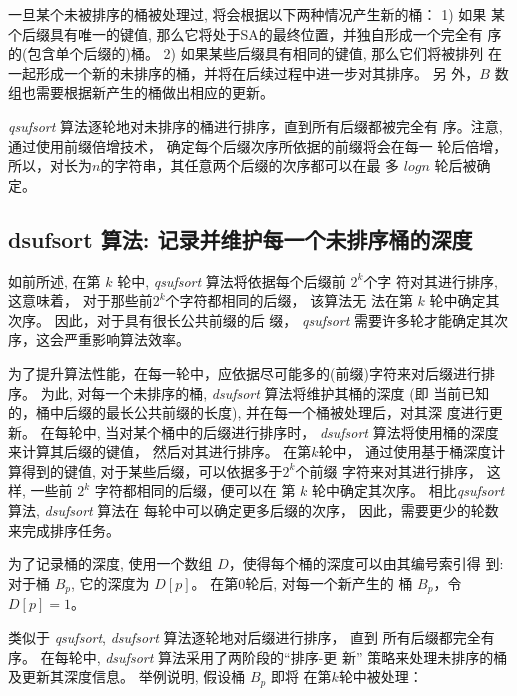 一旦某个未被排序的桶被处理过, 将会根据以下两种情况产生新的桶： 1) 如果
某个后缀具有唯一的键值, 那么它将处于SA的最终位置，并独自形成一个完全有
序的(包含单个后缀的)桶。 2) 如果某些后缀具有相同的键值, 那么它们将被排列
在一起形成一个新的未排序的桶，并将在后续过程中进一步对其排序。 另
外，$B$ 数组也需要根据新产生的桶做出相应的更新。

\emph{qsufsort} 算法逐轮地对未排序的桶进行排序，直到所有后缀都被完全有
序。注意, 通过使用前缀倍增技术， 确定每个后缀次序所依据的前缀将会在每一
轮后倍增，所以，对长为$n$的字符串，其任意两个后缀的次序都可以在最
多 $logn$ 轮后被确定。

\subsection{dsufsort 算法: 记录并维护每一个未排序桶的深度}
\label{sec:dsufsort}

如前所述, 在第 $k$ 轮中, \emph{qsufsort} 算法将依据每个后缀前 $2^k$个字
符对其进行排序, 这意味着， 对于那些前$2^k$个字符都相同的后缀， 该算法无
法在第 $k$ 轮中确定其次序。 因此，对于具有很长公共前缀的后
缀， \emph{qsufsort} 需要许多轮才能确定其次序，这会严重影响算法效率。

为了提升算法性能，在每一轮中，应依据尽可能多的(前缀)字符来对后缀进行排
序。 为此, 对每一个未排序的桶, \emph{dsufsort} 算法将维护其桶的深度 (即
当前已知的，桶中后缀的最长公共前缀的长度), 并在每一个桶被处理后，对其深
度进行更新。 在每轮中, 当对某个桶中的后缀进行排序时， \emph{dsufsort}
算法将使用桶的深度来计算其后缀的键值， 然后对其进行排序。 在第$k$轮中，
通过使用基于桶深度计算得到的键值, 对于某些后缀，可以依据多于$2^k$个前缀
字符来对其进行排序， 这样, 一些前 $2^k$ 字符都相同的后缀，便可以在
第 $k$ 轮中确定其次序。 相比\emph{qsufsort}算法, \emph{dsufsort} 算法在
每轮中可以确定更多后缀的次序， 因此，需要更少的轮数来完成排序任务。

为了记录桶的深度, 使用一个数组 $D$，使得每个桶的深度可以由其编号索引得
到: 对于桶 $B_p$, 它的深度为 $D[p]$。 在第0轮后, 对每一个新产生的
桶 $B_p$，令 $D[p] = 1$。

类似于 \emph{qsufsort}, \emph{dsufsort} 算法逐轮地对后缀进行排序， 直到
所有后缀都完全有序。 在每轮中, \emph{dsufsort} 算法采用了两阶段的“排序-更
新” 策略来处理未排序的桶及更新其深度信息。 举例说明, 假设桶 $B_p$ 即将
在第$k$轮中被处理：

